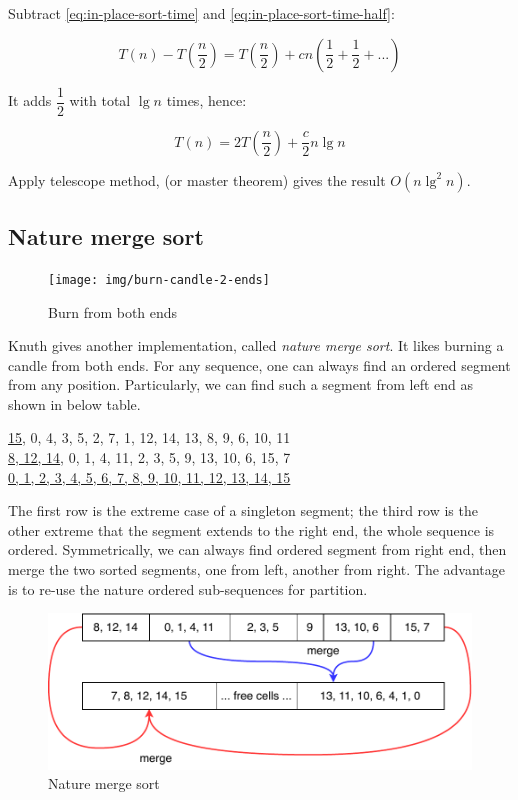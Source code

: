\documentclass[b5paper]{article}
\begin{document}
Subtract \cref{eq:in-place-sort-time} and \cref{eq:in-place-sort-time-half}:

\[
T(n) - T(\frac{n}{2}) = T(\frac{n}{2}) + c n (\frac{1}{2} + \frac{1}{2} + ... )
\]

It adds $\dfrac{1}{2}$ with total $\lg n$ times, hence:

\[
T(n) = 2 T(\frac{n}{2}) + \frac{c}{2} n \lg n
\]

Apply telescope method, (or master theorem) gives the result $O(n \lg^2 n)$.

\subsection{Nature merge sort}

\begin{figure}[htbp]
 \centering
 \texttt{[image: img/burn-candle-2-ends]}
 \caption{Burn from both ends}
 \label{fig:burn-candle}
\end{figure}

Knuth gives another implementation, called {\em nature merge sort}. It likes burning a candle from both ends\cite{TAOCP}. For any sequence, one can always find an ordered segment from any position. Particularly, we can find such a segment from left end as shown in below table.

\underline{15}, 0, 4, 3, 5, 2, 7, 1, 12, 14, 13, 8, 9, 6, 10, 11 \\
\underline{8, 12, 14}, 0, 1, 4, 11, 2, 3, 5, 9, 13, 10, 6, 15, 7 \\
\underline{0, 1, 2, 3, 4, 5, 6, 7, 8, 9, 10, 11, 12, 13, 14, 15 } \\
\etab

The first row is the extreme case of a singleton segment; the third row is the other extreme that the segment extends to the right end, the whole sequence is ordered. Symmetrically, we can always find ordered segment from right end, then merge the two sorted segments, one from left, another from right. The advantage is to re-use the nature ordered sub-sequences for partition.

\begin{figure}[htbp]
 \centering
 \includegraphics[scale=0.7]{img/nature-merge-sort}
 \caption{Nature merge sort}
 \label{fig:nature-merge-sort}
\end{figure}
\end{document}

